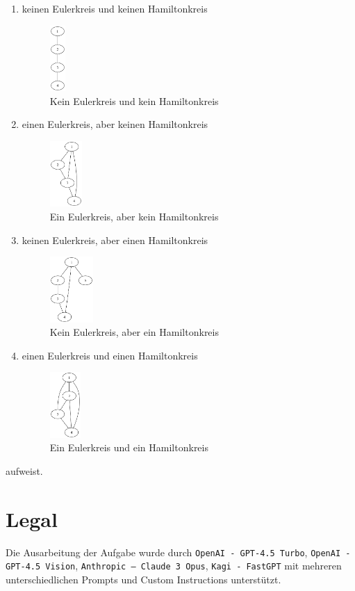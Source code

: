 \documentclass[a4paper,11pt]{report}
\begin{document}
\begin{enumerate}[label=\alph*.]
    \item keinen Eulerkreis und keinen Hamiltonkreis
    \begin{figure}[htbp]
        \centering
        \includegraphics[height=2.5cm]{notebook/assets/aufgabe_08_graph_a.png}
        \caption{Kein Eulerkreis und kein Hamiltonkreis}
        \label{fig:no_euler_no_hamilton}
    \end{figure}
    \item einen Eulerkreis, aber keinen Hamiltonkreis
    \begin{figure}[htbp]
        \centering
        \includegraphics[height=2.5cm]{notebook/assets/aufgabe_08_graph_b.png}
        \caption{Ein Eulerkreis, aber kein Hamiltonkreis}
        \label{fig:neuler_no_hamilton}
    \end{figure}
    \item keinen Eulerkreis, aber einen Hamiltonkreis
    \begin{figure}[htbp]
        \centering
        \includegraphics[height=2.5cm]{notebook/assets/aufgabe_08_graph_c.png}
        \caption{Kein Eulerkreis, aber ein Hamiltonkreis}
        \label{fig:no_euler_hamilton}
    \end{figure}
    \item einen Eulerkreis und einen Hamiltonkreis
    \begin{figure}[htbp]
        \centering
        \includegraphics[height=2.5cm]{notebook/assets/aufgabe_08_graph_d.png}
        \caption{Ein Eulerkreis und ein Hamiltonkreis}
        \label{fig:euler_hamilton}
    \end{figure}
\end{enumerate}

aufweist.

\newpage

\chapter{Legal}
Die Ausarbeitung der Aufgabe wurde durch \texttt{OpenAI - GPT-4.5 Turbo}, \texttt{OpenAI - GPT-4.5 Vision}, \texttt{Anthropic -- Claude 3 Opus},  \texttt{Kagi - FastGPT} mit mehreren unterschiedlichen Prompts und Custom Instructions unterstützt.
\end{document}
